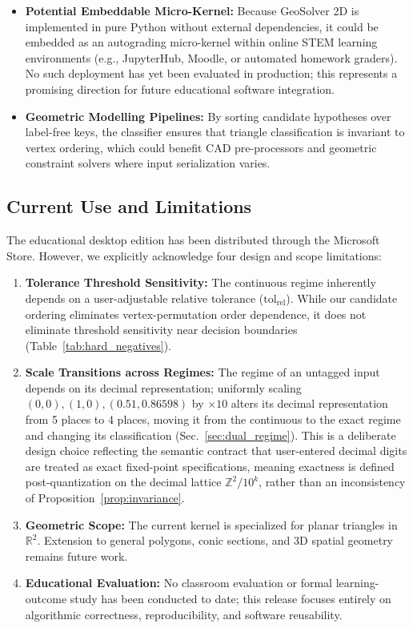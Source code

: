 \documentclass[preprint,12pt]{elsarticle}
\begin{document}
\begin{itemize}
\item \textbf{Potential Embeddable Micro-Kernel:} Because GeoSolver 2D is implemented in pure Python without external dependencies, it could be embedded as an autograding micro-kernel within online STEM learning environments (e.g., JupyterHub, Moodle, or automated homework graders). No such deployment has yet been evaluated in production; this represents a promising direction for future educational software integration.
\item \textbf{Geometric Modelling Pipelines:} By sorting candidate hypotheses over label-free keys, the classifier ensures that triangle classification is invariant to vertex ordering, which could benefit CAD pre-processors and geometric constraint solvers where input serialization varies.
\end{itemize}

\subsection{Current Use and Limitations}
The educational desktop edition has been distributed through the Microsoft Store. However, we explicitly acknowledge four design and scope limitations:
\begin{enumerate}
\item \textbf{Tolerance Threshold Sensitivity:} The continuous regime inherently depends on a user-adjustable relative tolerance ($\mathrm{tol_{rel}}$). While our candidate ordering eliminates vertex-permutation order dependence, it does not eliminate threshold sensitivity near decision boundaries (Table~\ref{tab:hard_negatives}).
\item \textbf{Scale Transitions across Regimes:} The regime of an untagged input depends on its decimal representation; uniformly scaling $(0,0), (1,0), (0.51, 0.86598)$ by $\times 10$ alters its decimal representation from 5 places to 4 places, moving it from the continuous to the exact regime and changing its classification (Sec.~\ref{sec:dual_regime}). This is a deliberate design choice reflecting the semantic contract that user-entered decimal digits are treated as exact fixed-point specifications, meaning exactness is defined post-quantization on the decimal lattice $\mathbb{Z}^2/10^k$, rather than an inconsistency of Proposition~\ref{prop:invariance}.
\item \textbf{Geometric Scope:} The current kernel is specialized for planar triangles in $\mathbb{R}^2$. Extension to general polygons, conic sections, and 3D spatial geometry remains future work.
\item \textbf{Educational Evaluation:} No classroom evaluation or formal learning-outcome study has been conducted to date; this release focuses entirely on algorithmic correctness, reproducibility, and software reusability.
\end{enumerate}
\end{document}
